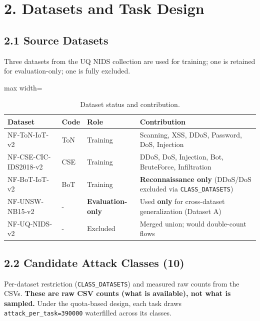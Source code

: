 \documentclass[11pt,a4paper]{article}
\begin{document}
\section*{2. Datasets and Task Design}

\subsection*{2.1 Source Datasets}
Three datasets from the UQ NIDS collection are used for training; one is retained for evaluation-only; one is fully excluded.

\begin{table}[H]
\centering
\caption{Dataset status and contribution.}
\label{tab:datasets}
\begin{adjustbox}{max width=\textwidth}
\begin{tabular}{llll}
\toprule
Dataset & Code & Role & Contribution \\
\midrule
NF-ToN-IoT-v2 & ToN & Training & Scanning, XSS, DDoS, Password, DoS, Injection \\
NF-CSE-CIC-IDS2018-v2 & CSE & Training & DDoS, DoS, Injection, Bot, BruteForce, Infiltration \\
NF-BoT-IoT-v2 & BoT & Training & \textbf{Reconnaissance only} (DDoS/DoS excluded via \texttt{CLASS\_DATASETS}) \\
NF-UNSW-NB15-v2 & - & \textbf{Evaluation-only} & Used \textbf{only} for cross-dataset generalization (Dataset A) \\
NF-UQ-NIDS-v2 & - & Excluded & Merged union; would double-count flows \\
\bottomrule
\end{tabular}
\end{adjustbox}
\end{table}

\subsection*{2.2 Candidate Attack Classes (10)}
Per-dataset restriction (\texttt{CLASS\_DATASETS}) and measured raw counts from the CSVs. \textbf{These are raw CSV counts (what is available), not what is sampled.} Under the quota-based design, each task draws \texttt{attack\_per\_task=390000} waterfilled across its classes.
\end{document}
